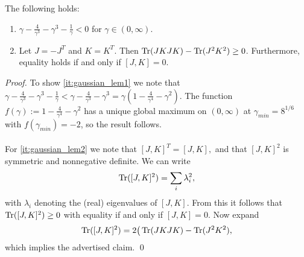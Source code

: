 \begin{lemma}
	\label{lem:basic_inequalities}
	The following holds: 
	\begin{enumerate}[label=(\alph*)]
		\item \label{it:gaussian_lem1}$\gamma-\frac{4}{\gamma^{3}}-\gamma^{3}-\frac{1}{\gamma}<0$
		for $\gamma\in(0,\infty)$. 
		\item \label{it:gaussian_lem2} Let $J=-J^{T}$ and $K=K^{T}$. Then $\operatorname{Tr}(JKJK)-\operatorname{Tr}(J^{2}K^{2})\ge0$.
		Furthermore, equality holds if and only if $[J,K]=0.$ 
	\end{enumerate}
\end{lemma}
\begin{proof}
	To show \ref{it:gaussian_lem1} we note that $\gamma-\frac{4}{\gamma^{3}}-\gamma^{3}-\frac{1}{\gamma}<\gamma-\frac{4}{\gamma^{3}}-\gamma^{3}=\gamma(1 - \frac{4}{\gamma^4}-\gamma^2)$.  The function $f(\gamma):=1 - \frac{4}{\gamma^4}-\gamma^2$
	has a unique global maximum on $(0,\infty)$ at $\gamma_{min}=8^{1/6}$
	with $f(\gamma_{min})=-2$, so the result follows.
	\\\\
	For \ref{it:gaussian_lem2} we note that $[J,K]^{T}=[J,K],$ and that $[J,K]^{2}$ is symmetric
	and nonnegative definite. We can write 
	\[
	\operatorname{Tr}([J,K]^{2})=\sum_{i}\lambda_{i}^{2},
	\]
	with $\lambda_{i}$ denoting the (real) eigenvalues of $[J,K]$. From
	this it follows that $\operatorname{Tr}([J,K]^{2})\ge0$ with equality if and only
	if $[J,K]=0$. Now expand 
	\[
	\operatorname{Tr}([J,K]^{2})=2\big(\operatorname{Tr}(JKJK)-\operatorname{Tr}(J^{2}K^{2}),
	\]
	which implies the advertised claim. \qed
\end{proof}